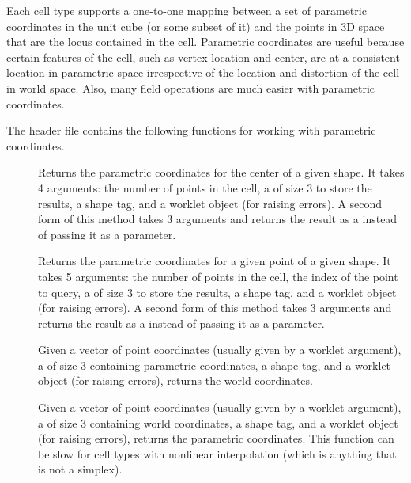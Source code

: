 
Each cell type supports a one-to-one mapping between a set of parametric
coordinates in the unit cube (or some subset of it) and the points in 3D
space that are the locus contained in the cell. Parametric coordinates are
useful because certain features of the cell, such as vertex location and
center, are at a consistent location in parametric space irrespective of
the location and distortion of the cell in world space. Also, many field
operations are much easier with parametric coordinates.

The  header file contains the
following functions for working with parametric coordinates.

\begin{description}
\item[] Returns the parametric
  coordinates for the center of a given shape. It takes 4 arguments: the
  number of points in the cell, a  of size 3 to store the
  results, a shape tag, and a worklet object (for raising errors). A second
  form of this method takes 3 arguments and returns the result as a
  \textcode{<} instead of
  passing it as a parameter.
\item[] Returns the parametric
  coordinates for a given point of a given shape. It takes 5 arguments: the
  number of points in the cell, the index of the point to query, a
   of size 3 to store the results, a shape tag, and a worklet
  object (for raising errors). A second form of this method takes 3
  arguments and returns the result as a
  \textcode{<} instead of
  passing it as a parameter.
\item[] Given a vector of
  point coordinates (usually given by a  worklet
  argument), a  of size 3 containing parametric coordinates, a
  shape tag, and a worklet object (for raising errors), returns the world
  coordinates.
\item[] Given a vector of
  point coordinates (usually given by a  worklet
  argument), a  of size 3 containing world coordinates, a shape
  tag, and a worklet object (for raising errors), returns the parametric
  coordinates. This function can be slow for cell types with nonlinear
  interpolation (which is anything that is not a simplex).
\end{description}

